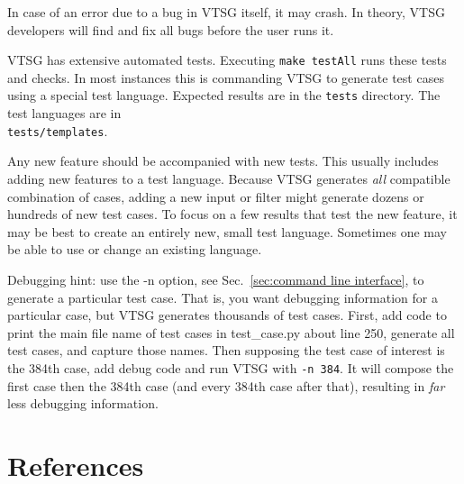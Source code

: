 In case of an error due to a bug in VTSG itself, it may crash.  In theory, VTSG
developers will find and fix all bugs before the user runs it.

VTSG has extensive automated tests.  Executing \verb|make testAll| runs these tests
and checks.  In most instances this is commanding VTSG to generate test cases using a
special test language.  Expected results are in the \verb|tests| directory.  The
test languages are in \\ \verb|tests/templates|.

Any new feature should be accompanied with new tests.  This usually includes adding
new features to a test language.  Because VTSG generates \emph{all} compatible
combination of cases, adding a new input or filter might generate dozens or hundreds
of new test cases.  To focus on a few results that test the new feature, it may be
best to create an entirely new, small test language.  Sometimes one may be able to
use or change an existing language.

Debugging hint: use the -n option, see Sec.~\ref{sec:command line interface}, to
generate a particular test case.  That is, you want debugging information for a
particular case, but VTSG generates thousands of test cases.  First, add code to
print the main file name of test cases in test\_case.py about line 250, generate all
test cases, and capture those names.  Then supposing the test case of interest is the
384th case, add debug code and run VTSG with \verb|-n 384|.  It will compose the
first case then the 384th case (and every 384th case after that), resulting in
\emph{far} less debugging information.


\section*{References}



